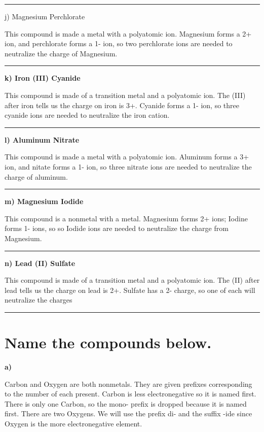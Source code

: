 \documentclass[12pt, oneside, letterpaper]{book}
\begin{document}
\hrule

\textbf{}{j) Magnesium Perchlorate}

This compound is made a metal with a polyatomic ion. Magnesium forms a 2+ ion, and perchlorate forms a 1- ion, so two perchlorate ions are needed to neutralize the charge of Magnesium.  



\hrule

\textbf{k) Iron (III) Cyanide}

This compound is made of a transition metal and a polyatomic ion. The (III) after iron tells us the charge on iron is 3+. Cyanide forms a 1- ion, so three cyanide ions are needed to neutralize the iron cation. 



\hrule

\textbf{l) Aluminum Nitrate}

This compound is made a metal with a polyatomic ion. Aluminum forms a 3+ ion, and nitate forms a 1- ion, so three nitrate ions are needed to neutralize the charge of aluminum.  


\hrule

\textbf{m) Magnesium Iodide}

This compound is a nonmetal with a metal. Magnesium forms 2+ ions; Iodine forms 1- ions, so so Iodide ions are needed to neutralize the charge from Magnesium. 


\hrule

\textbf{n) Lead (II) Sulfate}

This compound is made of a transition metal and a polyatomic ion. The (II) after lead tells us the charge on lead is 2+. Sulfate has a 2- charge, so one of each will neutralize the charges 


\hrule

\section{Name the compounds below.} 

\textbf{a) }

Carbon and Oxygen are both nonmetals. They are given prefixes corresponding to the number of each present. Carbon is less electronegative so it is named first. There is only one Carbon, so the mono- prefix is dropped because it is named first. There are two Oxygens. We will use the prefix di- and the suffix -ide since Oxygen is the more electronegative element. 
\end{document}
